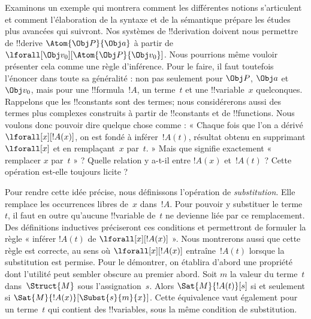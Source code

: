 \documentclass[../../../include/open-logic-section]{subfiles}
\begin{document}


Examinons un exemple qui montrera comment les différentes notions
s'articulent et comment l'élaboration de la syntaxe et de la sémantique
prépare les études plus avancées qui suivront. Nos systèmes de
!!{derivation} doivent nous permettre de !!{derive}
$\Atom{\Obj P}{\Obj a}$ à partir de
$\lforall[\Obj v_0][\Atom{\Obj P}{\Obj v_0}]$. Nous pourrions même
vouloir présenter cela comme une règle d'inférence. Pour le faire, il
faut toutefois l'énoncer dans toute sa généralité : non pas seulement
pour $\Obj P$, $\Obj a$ et $\Obj v_0$, mais pour une
!!{formula}~$!A$, un terme~$t$ et une !!{variable}~$x$ quelconques.
Rappelons que les !!{constant}s sont des termes; nous considérerons
aussi des termes plus complexes construits à partir de !!{constant}s
et de !!{function}s. Nous voulons donc pouvoir dire quelque chose
comme : « Chaque fois que l'on a dérivé
$\lforall[x][!A(x)]$, on est fondé à inférer~$!A(t)$, résultat obtenu
en supprimant $\lforall[x]$ et en remplaçant~$x$ par~$t$. » Mais que
signifie exactement « remplacer $x$ par~$t$ » ? Quelle relation y
a-t-il entre $!A(x)$ et~$!A(t)$ ? Cette opération est-elle toujours
licite ?

Pour rendre cette idée précise, nous définissons l'opération de
\emph{substitution}. Elle remplace les occurrences libres de~$x$
dans~$!A$. Pour pouvoir y substituer le terme~$t$, il faut en outre
qu'aucune !!{variable} de~$t$ ne devienne liée par ce remplacement.
Des définitions inductives préciseront ces conditions et permettront
de formuler la règle « inférer $!A(t)$ de $\lforall[x][!A(x)]$ ».
Nous montrerons aussi que cette règle est correcte, au sens où
$\lforall[x][!A(x)]$ entraîne~$!A(t)$ lorsque la substitution est
permise. Pour le démontrer, on établira d'abord une propriété dont
l'utilité peut sembler obscure au premier abord. Soit $m$ la valeur
du terme~$t$ dans~$\Struct{M}$ sous l'assignation~$s$. Alors
$\Sat{M}{!A(t)}[s]$ si et seulement si
$\Sat{M}{!A(x)}[\Subst{s}{m}{x}]$. Cette équivalence vaut également
pour un terme~$t$ qui contient des !!{variable}s, sous la même
condition de substitution.
\end{document}
